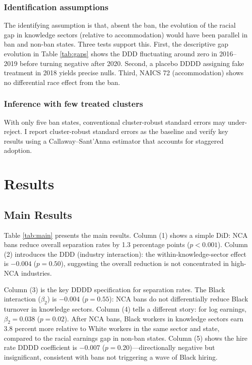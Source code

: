 \documentclass[12pt]{article}
\begin{document}
\subsubsection*{Identification assumptions} The identifying assumption is that, absent the ban, the evolution of the racial gap in knowledge sectors (relative to accommodation) would have been parallel in ban and non-ban states. Three tests support this. First, the descriptive gap evolution in Table \ref{tab:gaps} shows the DDD fluctuating around zero in 2016--2019 before turning negative after 2020. Second, a placebo DDDD assigning fake treatment in 2018 yields precise nulls. Third, NAICS 72 (accommodation) shows no differential race effect from the ban.

\subsubsection*{Inference with few treated clusters} With only five ban states, conventional cluster-robust standard errors may under-reject. I report cluster-robust standard errors as the baseline and verify key results using a Callaway--Sant'Anna estimator \citep{callaway2021did} that accounts for staggered adoption.

\section{Results}

\subsection{Main Results}

\begin{table}[t]
\caption{Non-Compete Bans and the Racial Mobility Gap: Main Results}
\label{tab:main}
\small
{}
\end{table}

Table \ref{tab:main} presents the main results. Column (1) shows a simple DiD: NCA bans reduce overall separation rates by 1.3 percentage points ($p < 0.001$). Column (2) introduces the DDD (industry interaction): the within-knowledge-sector effect is $-0.004$ ($p = 0.50$), suggesting the overall reduction is not concentrated in high-NCA industries.

Column (3) is the key DDDD specification for separation rates. The Black interaction ($\beta_2$) is $-0.004$ ($p = 0.55$): NCA bans do not differentially reduce Black turnover in knowledge sectors. Column (4) tells a different story: for log earnings, $\beta_2 = 0.038$ ($p = 0.02$). After NCA bans, Black workers in knowledge sectors earn 3.8 percent more relative to White workers in the same sector and state, compared to the racial earnings gap in non-ban states. Column (5) shows the hire rate DDDD coefficient is $-0.007$ ($p = 0.20$)---directionally negative but insignificant, consistent with bans not triggering a wave of Black hiring.
\end{document}
